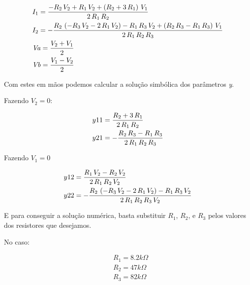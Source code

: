 \documentclass[12pt,twoside, a4paper, twocolumn]{article}
\begin{document}
\begin{equation}
    \begin{aligned}
         & I_{1}={{-R_{2}\,V_{2}+R_{1}\,V_{2}+\left(R_{2}+3\,R_{1}\right)\, V_{1}}\over{2\,R_{1}\,R_{2}}}                                                                \\
         & I_{2}=-{{R_{2}\,\left(-R_{3}\,V_{2}-2\,R_{1}\,V_{2}\right)-R_{1}\, R_{3}\,V_{2}+\left(R_{2}\,R_{3}-R_{1}\,R_{3}\right)\,V_{1}}\over{2\, R_{1}\,R_{2}\,R_{3}}} \\
         & {\it Va}={{V_{2}+V_{1}}\over{2}}                                                                                                                              \\
         & {\it Vb}={{V_{1}-V_{2}}\over{2}}
    \end{aligned}
\end{equation}


Com estes em mãos podemos calcular a solução simbólica dos parâmetros \emph{y}.


Fazendo $V_2 = 0$:


\begin{equation}
    \begin{aligned}
         & y11 = {{R_{2}+3\,R_{1}}\over{2\,R_{1}\,R_{2}}}                    \\
         & y21 = -{{R_{2}\,R_{3}-R_{1}\,R_{3}}\over{2\,R_{1}\,R_{2}\,R_{3}}}
    \end{aligned}
\end{equation}


Fazendo $V_1 = 0$


\begin{equation}
    \begin{aligned}
         & y12 = {{R_{1}\,V_{2}-R_{2}\,V_{2}}\over{2\,R_{1}\,R_{2}\,V_{2}}}                                                      \\
         & y22 = -{{R_{2}\,\left(-R_{3}\,V_{2}-2\,R_{1}\,V_{2}\right)-R_{1}\,R_{3}\, V_{2}}\over{2\,R_{1}\,R_{2}\,R_{3}\,V_{2}}}
    \end{aligned}
\end{equation}


E para conseguir a solução numérica, basta substituir $R_1$, $R_2$, e $R_3$ pelos valores dos resistores que desejamos.


No caso:


\begin{equation}
    \begin{aligned}
         & R_1 = 8.2k \varOmega \\
         & R_2 = 47k \varOmega  \\
         & R_3 = 82k \varOmega  \\
    \end{aligned}
\end{equation}
\end{document}

